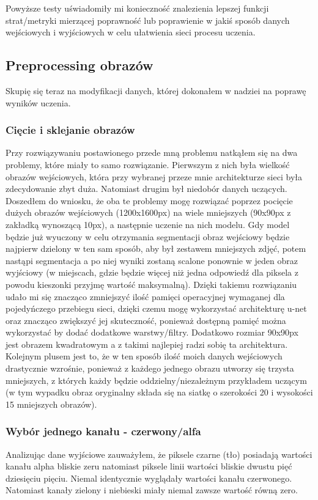 \documentclass{article}
\begin{document}
Powyższe testy uświadomiły mi konieczność znalezienia lepszej funkcji strat/metryki mierzącej poprawność lub poprawienie w jakiś sposób danych wejściowych i wyjściowych w celu ułatwienia sieci procesu uczenia.
\subsection{Preprocessing obrazów}
Skupię się teraz na modyfikacji danych, której dokonałem w nadziei na poprawę wyników uczenia.
\subsubsection{Cięcie i sklejanie obrazów}
Przy rozwiązywaniu postawionego przede mną problemu natkąłem się na dwa problemy, które miały to samo rozwiązanie.
Pierwszym z nich była wielkość obrazów wejściowych, która przy wybranej przeze mnie architekturze sieci była zdecydowanie zbyt duża.
Natomiast drugim był niedobór danych uczących.
Doszedłem do wniosku, że oba te problemy mogę rozwiązać poprzez pocięcie dużych obrazów wejściowych (1200x1600px) na wiele mniejszych (90x90px z zakładką wynoszącą 10px), a następnie uczenie na nich modelu.
Gdy model będzie już wyuczony w celu otrzymania segmentacji obraz wejściowy będzie najpierw dzielony w ten sam sposób, aby był zestawem mniejszych zdjęć, potem nastąpi segmentacja a po niej wyniki zostaną scalone ponownie w jeden obraz wyjściowy (w miejscach, gdzie będzie więcej niż jedna odpowiedź dla piksela z powodu kieszonki przyjmę wartość maksymalną).
Dzięki takiemu rozwiązaniu udało mi się znacząco zmniejszyć ilość pamięci operacyjnej wymaganej dla pojedyńczego przebiegu sieci, dzięki czemu mogę wykorzystać architekturę u-net oraz znacząco zwiększyć jej skuteczność, ponieważ dostępną pamięć można wykorzystać by dodać dodatkowe warstwy/filtry.
Dodatkowo rozmiar 90x90px jest obrazem kwadratowym a z takimi najlepiej radzi sobię ta architektura.
Kolejnym plusem jest to, że w ten sposób ilość moich danych wejściowych drastycznie wzrośnie, ponieważ z każdego jednego obrazu utworzy się trzysta mniejszych, z których każdy będzie oddzielny/niezależnym przykładem uczącym (w tym wypadku obraz oryginalny składa się na siatkę o szerokości 20 i wysokości 15 mniejszych obrazów).
\subsubsection{Wybór jednego kanału - czerwony/alfa}
Analizując dane wyjściowe zauważyłem, że piksele czarne (tło) posiadają wartości kanału alpha bliskie zeru natomiast piksele linii wartości bliskie dwustu pięć dziesięciu pięciu.
Niemal identycznie wyglądały wartości kanału czerwonego.
Natomiast kanały zielony i niebieski miały niemal zawsze wartość równą zero.
\end{document}

